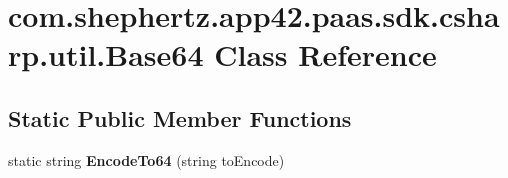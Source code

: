 \hypertarget{classcom_1_1shephertz_1_1app42_1_1paas_1_1sdk_1_1csharp_1_1util_1_1_base64}{\section{com.\+shephertz.\+app42.\+paas.\+sdk.\+csharp.\+util.\+Base64 Class Reference}
\label{classcom_1_1shephertz_1_1app42_1_1paas_1_1sdk_1_1csharp_1_1util_1_1_base64}
}
\subsection*{Static Public Member Functions}
\begin{DoxyCompactItemize}
\item 
\hypertarget{classcom_1_1shephertz_1_1app42_1_1paas_1_1sdk_1_1csharp_1_1util_1_1_base64_a8d9458ca50cbc58bf35c6d982ff2c211}{static string {\bfseries Encode\+To64} (string to\+Encode)}\label{classcom_1_1shephertz_1_1app42_1_1paas_1_1sdk_1_1csharp_1_1util_1_1_base64_a8d9458ca50cbc58bf35c6d982ff2c211}

\end{DoxyCompactItemize}
